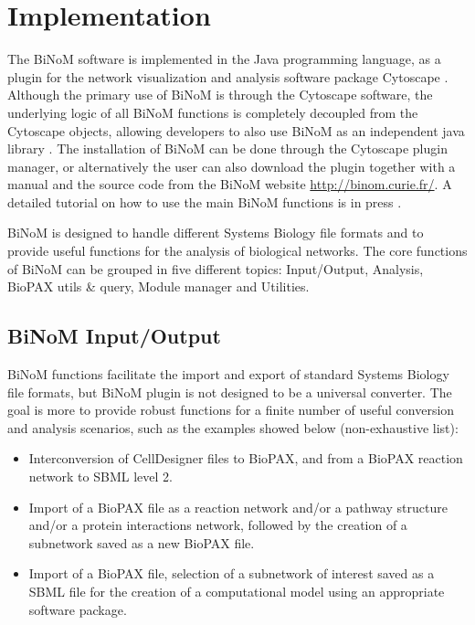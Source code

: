 \documentclass[10pt]{bmc_article}
\newenvironment{bmcformat}{\baselineskip20pt\sloppy\setboolean{publ}{false}}{\baselineskip20pt\sloppy}
\begin{document}
\begin{bmcformat}
\section*{Implementation}
The BiNoM software is implemented in the Java programming language, as a plugin
for the network visualization and analysis software package Cytoscape
\cite{cline2007integration}. Although the primary use of BiNoM is through the
Cytoscape software, the underlying logic of all BiNoM functions is completely
decoupled from the Cytoscape objects, allowing developers to also use BiNoM as
an independent java library \cite{zinovyev2008binom}. The installation of BiNoM
can be done through the Cytoscape plugin manager, or alternatively the user can
also download the plugin together with a manual and the source code from the
BiNoM website
\url{http://binom.curie.fr/}. A detailed tutorial on how to use the main BiNoM
functions is in press
\cite{binomBookChapter}.


BiNoM is designed to handle different Systems Biology file formats and to
provide useful functions for the analysis of biological networks. The core
functions of BiNoM can be grouped in five different topics: Input/Output,
Analysis, BioPAX utils \& query, Module manager and Utilities.


\subsection*{BiNoM Input/Output}

BiNoM functions facilitate the import and export of standard Systems Biology
file formats, but BiNoM plugin is not designed to be a universal converter.
The goal is more
to provide robust functions for a finite number of useful conversion and
analysis scenarios, such as the examples showed below (non-exhaustive list): 

\begin{itemize}

\item Interconversion of CellDesigner files to BioPAX, and from a BioPAX
reaction network to SBML level 2.

\item Import of a BioPAX file as a reaction network and/or a pathway structure
and/or a protein interactions network, followed by the creation of a subnetwork
saved as a new BioPAX file. 

\item Import of a BioPAX file, selection of a subnetwork of interest saved as a SBML file for
the creation of a computational model using an appropriate software package.


\end{itemize}
\end{bmcformat}
\end{document}
